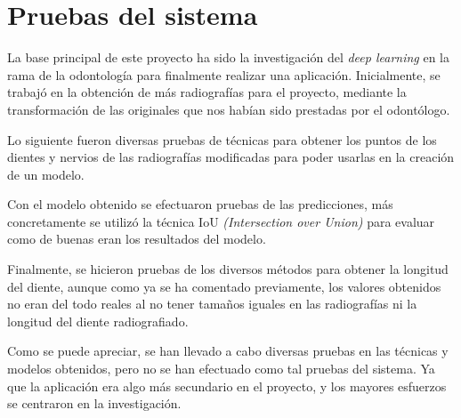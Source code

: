 \section{Pruebas del sistema}
La base principal de este proyecto ha sido la investigación del \emph{deep learning} en la rama de la odontología para finalmente realizar una aplicación. Inicialmente, se trabajó en la obtención de más radiografías para el proyecto, mediante la transformación de las originales que nos habían sido prestadas por el odontólogo.

Lo siguiente fueron diversas pruebas de técnicas para obtener los puntos de los dientes y nervios de las radiografías modificadas para poder usarlas en la creación de un modelo.

Con el modelo obtenido se efectuaron pruebas de las predicciones, más concretamente se utilizó la técnica IoU \emph{(Intersection over Union)} para evaluar como de buenas eran los resultados del modelo.

Finalmente, se hicieron pruebas de los diversos métodos para obtener la longitud del diente, aunque como ya se ha comentado previamente, los valores obtenidos no eran del todo reales al no tener tamaños iguales en las radiografías ni la longitud del diente radiografiado.

Como se puede apreciar, se han llevado a cabo diversas pruebas en las técnicas y modelos obtenidos, pero no se han efectuado como tal pruebas del sistema. Ya que la aplicación era algo más secundario en el proyecto, y los mayores esfuerzos se centraron en la investigación.